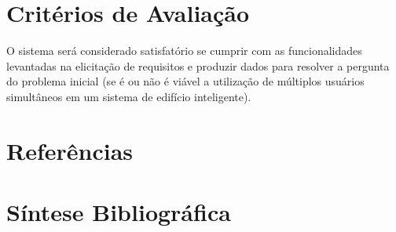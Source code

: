 \documentclass[
	12pt,				%
	a4paper,			%
	english,			%
	brazil,				%
	]{article}
\begin{document}
\section{Critérios de Avaliação} 
     
O sistema será considerado satisfatório se cumprir com as funcionalidades levantadas na elicitação de requisitos e produzir dados para resolver a pergunta do problema
inicial {(se é ou não é viável a utilização de múltiplos usuários simultâneos em um sistema de edifício inteligente)}.
    

\renewcommand\refname{}
\section{Referências}

    \vspace{-4.3em}
    
    
\section{Síntese Bibliográfica}

    \vspace{-3.5em}
    

 
\end{document}
